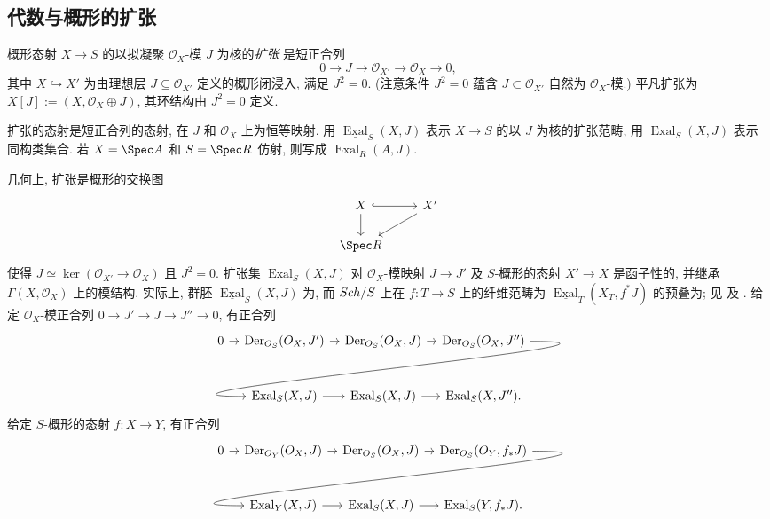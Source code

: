 \subsection{代数与概形的扩张}\label{src:C.3.3-subsection}
\begin{definition}\label{src:C.3.4}
概形态射 $X\to S$ 的以拟凝聚 $\mathcal O_X$-模 $J$ 为核的\textit{扩张} 是短正合列
\[
0\to J\to\mathcal O_{X'}\to\mathcal O_X\to0,
\]
其中 $X\hookrightarrow X'$ 为由理想层 $J\subseteq\mathcal O_{X'}$ 定义的概形闭浸入, 满足 $J^2=0$. (注意条件 $J^2=0$ 蕴含 $J\subset\mathcal O_{X'}$ 自然为 $\mathcal O_X$-模.) 平凡扩张为 $X[J]:=(X,\mathcal O_X\oplus J)$, 其环结构由 $J^2=0$ 定义.

扩张的态射是短正合列的态射, 在 $J$ 和 $\mathcal O_X$ 上为恒等映射. 用 $\underline{\operatorname{Exal}}_S(X,J)$ 表示 $X\to S$ 的以 $J$ 为核的扩张范畴, 用 $\operatorname{Exal}_S(X,J)$ 表示同构类集合. 若 $X=\Spec A$ 和 $S=\Spec R$ 仿射, 则写成 $\operatorname{Exal}_R(A,J)$.
\end{definition}
几何上, 扩张是概形的交换图
\[
\begin{tikzcd}
X\arrow[r,hook]\arrow[d]&X'\arrow[dl]\\
\Spec R&
\end{tikzcd}
\]
使得 $J\simeq\ker(\mathcal O_{X'}\to\mathcal O_X)$ 且 $J^2=0$. 扩张集 $\operatorname{Exal}_S(X,J)$ 对 $\mathcal O_X$-模映射 $J\to J'$ 及 $S$-概形的态射 $X'\to X$ 是函子性的, 并继承 $\Gamma(X,\mathcal O_X)$ 上的模结构. 实际上, 群胚 $\underline{\operatorname{Exal}}_S(X,J)$ 为, 而 $Sch/S$ 上在 $f:T\to S$ 上的纤维范畴为 $\underline{\operatorname{Exal}}_T(X_T,f^*J)$ 的预叠为; 见 \cite[III.$1.1.5$]{Ill71} 及 \cite[XVIII.$1.4$]{SGA4}. 给定 $\mathcal O_X$-模正合列 $0\to J'\to J\to J''\to0$, 有正合列
\begingroup\footnotesize
\[
\begin{tikzcd}[column sep=8pt,row sep=large]
0\arrow[r]&\operatorname{Der}_{\mathcal O_S}(\mathcal O_X,J')\arrow[r]&\operatorname{Der}_{\mathcal O_S}(\mathcal O_X,J)\arrow[r]&\operatorname{Der}_{\mathcal O_S}(\mathcal O_X,J'')\arrow[dll,out=0,in=180,looseness=1.5]\\
&\operatorname{Exal}_S(X,J)\arrow[r]&\operatorname{Exal}_S(X,J)\arrow[r]&\operatorname{Exal}_S(X,J'').
\end{tikzcd}
\]
\endgroup
给定 $S$-概形的态射 $f:X\to Y$, 有正合列
\begingroup\footnotesize
\[
\begin{tikzcd}[column sep=8pt,row sep=large]
0\arrow[r]&\operatorname{Der}_{\mathcal O_Y}(\mathcal O_X,J)\arrow[r]&\operatorname{Der}_{\mathcal O_S}(\mathcal O_X,J)\arrow[r]&\operatorname{Der}_{\mathcal O_S}(\mathcal O_Y,f_*J)\arrow[dll,out=0,in=180,looseness=1.5]\\
&\operatorname{Exal}_Y(X,J)\arrow[r]&\operatorname{Exal}_S(X,J)\arrow[r]&\operatorname{Exal}_S(Y,f_*J).
\end{tikzcd}
\]
